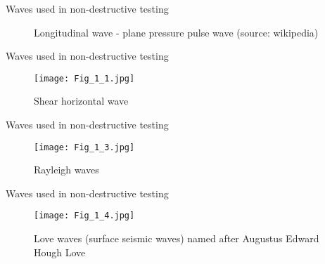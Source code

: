 \documentclass[10pt,aspectratio=169,notes]{beamer} %
\begin{document}
\begin{frame}{Waves used in non-destructive testing}
\begin{figure}
	\caption{\alert{Longitudinal wave}  - plane pressure pulse wave (source: wikipedia)}
\end{figure}
\end{frame}
\note{
	
}
\begin{frame}{Waves used in non-destructive testing}
	\begin{figure}
		\texttt{[image: Fig\_1\_1.jpg]}
		\caption{\alert{Shear horizontal wave} }
	\end{figure}
\end{frame}
\note{
	
}
\begin{frame}{Waves used in non-destructive testing}
	\begin{figure}
		\texttt{[image: Fig\_1\_3.jpg]}
		\caption{\alert{Rayleigh waves} }
	\end{figure}
\end{frame}
\note{
	
}
\begin{frame}{Waves used in non-destructive testing}
	\begin{figure}
		\texttt{[image: Fig\_1\_4.jpg]}
		\caption{\alert{Love waves} (surface seismic waves) named after Augustus Edward Hough Love }
	\end{figure}
\end{frame}
\note{
	
}
\end{document}
